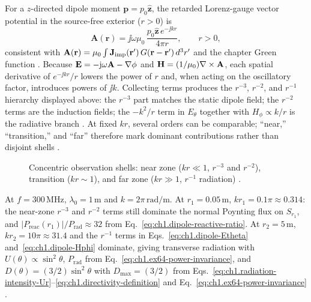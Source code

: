 For a $z$-directed dipole moment $\mathbf{p}=p_0\hat{\mathbf{z}}$, the retarded Lorenz-gauge vector potential in the source-free exterior ($r>0$) is
\begin{equation}
\label{eq:ch1.dipole-A-retarded}
\mathbf{A}(\mathbf{r})=\jj\omega\mu_0\,\frac{p_0\hat{\mathbf{z}}\,e^{-\jj kr}}{4\pi r},
\qquad r>0,
\end{equation}
consistent with $\mathbf{A}(\mathbf{r})=\mu_0\int \mathbf{J}_{\mathrm{imp}}(\mathbf{r}')\,G(\mathbf{r}-\mathbf{r}')\,d^{3}r'$ and the chapter Green function \cite{stratton1941,harrington2001,orfanidis2014}. Because $\mathbf{E}=-\mathrm{j}\omega\mathbf{A}-\nabla\phi$ and $\mathbf{H}=(1/\mu_0)\nabla\times\mathbf{A}$, each spatial derivative of $e^{-\jj kr}/r$ lowers the power of $r$ and, when acting on the oscillatory factor, introduces powers of $\jj k$. Collecting terms produces the $r^{-3}$, $r^{-2}$, and $r^{-1}$ hierarchy displayed above: the $r^{-3}$ part matches the static dipole field; the $r^{-2}$ terms are the induction fields; the $-k^2/r$ term in $E_\theta$ together with $H_\phi\propto k/r$ is the radiative branch \cite{stratton1941}. At fixed $kr$, several orders can be comparable; ``near,'' ``transition,'' and ``far'' therefore mark dominant contributions rather than disjoint shells \cite{stratton1941,poynting1884}.

\begin{figure}[t]
\centering
\VolIPhysFig{\VolIPhysDipoleThreeZones}
\caption{Concentric observation shells: near zone ($kr\ll1$, $r^{-3}$ and $r^{-2}$), transition ($kr\sim1$), and far zone ($kr\gg1$, $r^{-1}$ radiation) \cite{stratton1941,poynting1884}.}
\label{fig:ch1.dipole-three-zones}
\end{figure}

\begin{example}
\label{ex:ch1.dipole-kr}
At $f=300\,\mathrm{MHz}$, $\lambda_0=1\,\mathrm{m}$ and $k=2\pi\,\mathrm{rad/m}$. At $r_1=0.05\,\mathrm{m}$, $kr_1=0.1\pi\approx0.314$: the near-zone $r^{-3}$ and $r^{-2}$ terms still dominate the normal Poynting flux on $S_{r_1}$, and $|P_{\mathrm{reac}}(r_1)|/P_{\mathrm{rad}}\approx32$ from Eq.~\eqref{eq:ch1.dipole-reactive-ratio}. At $r_2=5\,\mathrm{m}$, $kr_2=10\pi\approx31.4$ and the $r^{-1}$ terms in Eqs.~\eqref{eq:ch1.dipole-Etheta} and~\eqref{eq:ch1.dipole-Hphi} dominate, giving transverse radiation with $U(\theta)\propto\sin^2\theta$, $P_{\mathrm{rad}}$ from Eq.~\eqref{eq:ch1.ex64-power-invariance}, and $D(\theta)=(3/2)\sin^2\theta$ with $D_{\max}=(3/2)$ from Eqs.~\eqref{eq:ch1.radiation-intensity-Ur}--\eqref{eq:ch1.directivity-definition} and Eq.~\eqref{eq:ch1.ex64-power-invariance} \cite{stratton1941,harrington2001}.
\end{example}

